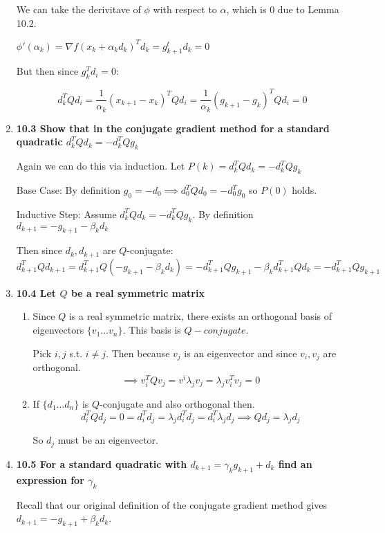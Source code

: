 \documentclass[10pt,a4paper]{article}
\begin{document}
\begin{enumerate}
    We can take the derivitave of $\phi$ with respect to $\alpha$, which is 0 due to Lemma 10.2.

    $\phi'(\alpha_k) = \nabla f(x_k + \alpha_k d_k)^Td_k = g_{k+1}^td_k = 0$

    But then since $g_k^Td_i = 0$:

    $$d_k^TQd_i = \frac{1}{\alpha_k}(x_{k+1} - x_k)^TQd_i = \frac{1}{\alpha_k}(g_{k+1} - g_k)^TQd_i = 0$$

     
    \item \textbf{10.3 Show that in the conjugate gradient method for a standard quadratic $d_k^TQd_k = - d_k^TQg_k$}
    
    Again we can do this via induction. Let $P(k) = d_k^TQd_k = - d_k^TQg_k$

    Base Case: By definition $g_0  = - d_0 \implies d_0^TQd_0 = -d_0^Tg_0$ so $P(0)$ holds.

    Inductive Step: Assume $d_k^TQd_k = -d_k^TQg_k$. By definition $d_{k+1} = - g_{k+1} - \beta_k d_k$

    Then since $d_k, d_{k+1}$ are $Q$-conjugate:
    $$d_{k+1}^TQd_{k+1} = d_{k+1}^TQ(-g_{k+1} - \beta_k d_k) = -d_{k+1}^TQg_{k+1} - \beta_kd_{k+1}^TQd_k = -d_{k+1}^TQg_{k+1}$$

    
    
    \item \textbf{10.4 Let $Q$ be a real symmetric matrix}
    \begin{enumerate}
        \item Since $Q$ is a real symmetric matrix, there exists an orthogonal basis of eigenvectors $\{v_1 \ldots v_n\}$.
        This basis is $Q-conjugate$. 

        Pick $i, j$ s.t. $i \neq j$. Then because $v_j$ is an eigenvector and since $v_i, v_j$ are orthogonal.
        $$\implies v_i^TQv_j = v^i\lambda_jv_j = \lambda_j v_i^Tv_j = 0$$

        \item If $\{d_1 \ldots d_n\}$ is $Q$-conjugate and also orthogonal then.
        $$d_i^TQd_j = 0 = d_i^Td_j = \lambda_j d_i^Td_j = d_i^T \lambda_j d_j \implies Qd_j = \lambda_jd_j$$

        So $d_j$ must be an eigenvector.
    \end{enumerate}

    \item \textbf{10.5 For a standard quadratic with $d_{k+1} = \gamma_k g_{k+1}+d_k$ find an expression for $\gamma_k$}
    
    Recall that our original definition of the conjugate gradient method gives $d_{k+1} = -g_{k+1} + \beta_k d_k$.


\end{enumerate}
\end{document}
